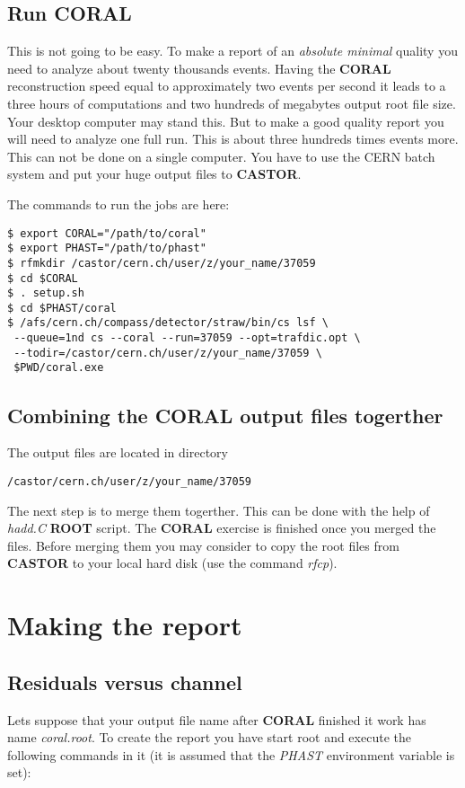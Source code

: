 \documentclass[a4paper,12pt]{article}
\begin{document}
\subsection{Run CORAL}
This is not going to be easy. To make a report of an {\it absolute minimal} quality you
need to analyze about twenty thousands events. Having the {\bf CORAL} reconstruction
speed equal to approximately two events per second it leads to a three hours of
computations and two hundreds of megabytes output root file size. Your desktop computer
may stand this. But to make a good quality report
you will need to analyze one full run. This is about three hundreds times events
more. This can not be done on a single computer. You
have to use the CERN batch system and put your huge output files to {\bf CASTOR}.

The commands to run the jobs are here:
\begin{verbatim}
$ export CORAL="/path/to/coral"
$ export PHAST="/path/to/phast"
$ rfmkdir /castor/cern.ch/user/z/your_name/37059
$ cd $CORAL
$ . setup.sh
$ cd $PHAST/coral
$ /afs/cern.ch/compass/detector/straw/bin/cs lsf \
 --queue=1nd cs --coral --run=37059 --opt=trafdic.opt \
 --todir=/castor/cern.ch/user/z/your_name/37059 \
 $PWD/coral.exe
\end{verbatim}

\subsection{Combining the CORAL output files togerther}
\label{CORAL-merge}
The output files are located in directory
\begin{verbatim}
/castor/cern.ch/user/z/your_name/37059
\end{verbatim}
The next step is to merge them togerther. This can be done with the help of
{\it hadd.C} {\bf ROOT} script. The {\bf CORAL} exercise is finished once you merged the
files. Before merging them you may consider to copy the root files from {\bf CASTOR} to
your local hard disk (use the command {\it rfcp}).



\section{Making the report}
\subsection{Residuals versus channel}
Lets suppose that your output file name after {\bf CORAL} finished it work
has name {\it coral.root}. To create the report you have start root
and execute the following commands in it (it is assumed that the {\it PHAST}
environment variable is set):
\end{document}

